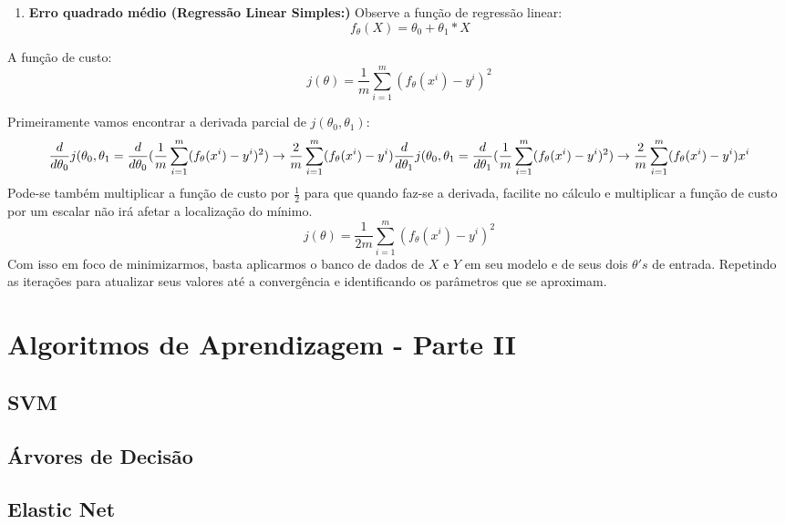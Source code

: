 \documentclass[
]{book}
\providecommand{\tightlist}{%
  \setlength{\itemsep}{0pt}\setlength{\parskip}{0pt}}
\begin{document}
\begin{enumerate}
\def\labelenumi{\arabic{enumi}.}
\setcounter{enumi}{2}
\tightlist
\item
  \textbf{Erro quadrado médio (Regressão Linear Simples:)} Observe a função de regressão linear:
  \[f_\theta(X)=\theta_0+\theta_1*X\]
\end{enumerate}

A função de custo:
\[j(\theta)=\frac{1}{m}\displaystyle \sum^m_{i=1}(f_\theta(x^i)-y^i)^2\]

Primeiramente vamos encontrar a derivada parcial de \(j(\theta_0,\theta_1)\):
\[\frac{d}{d\theta_0}j(\theta_0,\theta_1=\frac{d}{d\theta_0}(\frac{1}{m}\displaystyle \sum^m_{i=1}(f_{\theta}(x^i)-y^i)^2) \rightarrow \frac{2}{m}\displaystyle \sum^m_{i=1}(f_\theta(x^i)-y^i) \\
\frac{d}{d\theta_1}j(\theta_0,\theta_1=\frac{d}{d\theta_1}(\frac{1}{m}\displaystyle \sum^m_{i=1}(f_{\theta}(x^i)-y^i)^2) \rightarrow \frac{2}{m}\displaystyle \sum^m_{i=1}(f_\theta(x^i)-y^i)x^i\]
Pode-se também multiplicar a função de custo por \(\frac{1}{2}\) para que quando faz-se a derivada, facilite no cálculo e multiplicar a função de custo por um escalar não irá afetar a localização do mínimo.
\[j(\theta)=\frac{1}{2m}\displaystyle \sum^m_{i=1}(f_\theta(x^i)-y^i)^2\]
Com isso em foco de minimizarmos, basta aplicarmos o banco de dados de \(X\) e \(Y\) em seu modelo e de seus dois \(\theta's\) de entrada. Repetindo as iterações para atualizar seus valores até a convergência e identificando os parâmetros que se aproximam.

\hypertarget{algoritmos-de-aprendizagem---parte-ii}{%
\chapter{Algoritmos de Aprendizagem - Parte II}\label{algoritmos-de-aprendizagem---parte-ii}}

\hypertarget{svm}{%
\section{SVM}\label{svm}}

\hypertarget{uxe1rvores-de-decisuxe3o}{%
\section{Árvores de Decisão}\label{uxe1rvores-de-decisuxe3o}}

\hypertarget{elastic-net}{%
\section{Elastic Net}\label{elastic-net}}
\end{document}
